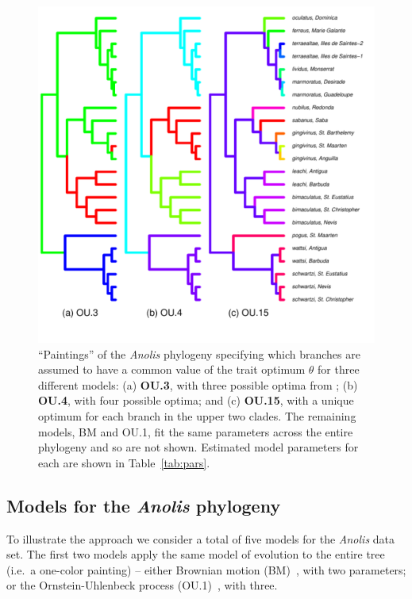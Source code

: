 \begin{figure}
\begin{center}
    \includegraphics[width=.8\textwidth]{../pmc/boettiger_figure3.pdf}
\end{center}
\caption{
``Paintings'' of the {\it Anolis} phylogeny specifying which branches are assumed to have a common value of the trait optimum $\theta$ for three different models:
(a) {\bf OU.3}, with three possible optima from \citet{Butler2004};
(b) {\bf OU.4}, with four possible optima; and
(c) {\bf OU.15}, with a unique optimum for each branch in the upper two clades.
The remaining models, BM and OU.1, fit the same parameters across the entire phylogeny and so are not shown.  
Estimated model parameters for each are shown in Table~\ref{tab:pars}.}

\label{fig:paint}
\end{figure}

\subsection{Models for the {\it Anolis} phylogeny}
To illustrate the approach we consider a total of five models for the {\it Anolis} data set.  
The first two models apply the same model of evolution to the entire tree (i.e.\ a one-color painting) -- 
either Brownian motion (BM)~\citep{Edwards1964,Felsenstein1985}, with two parameters; 
or the Ornstein-Uhlenbeck process (OU.1)~\citep{Felsenstein1985,Hansen1997}, with three.

